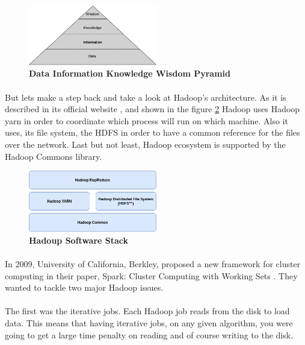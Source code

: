 \begin{figure}[h]
	\centering
	\includegraphics[width=0.5\textwidth]{images/DIKW.png}
	\caption{\bfseries Data Information Knowledge Wisdom Pyramid \cite{TheWisdomHierachy:7}}
	\label{dikw}
\end{figure}
\paragraph{} But lets make a step back and take a look at Hadoop's architecture. As it is described in its official website \cite{Hadoop:9}, and shown in the figure \ref{hadoopStack} Hadoop uses Hadoop yarn in order to coordinate which process will run on which machine. Also it uses, its file system, the HDFS in order to have a common reference for the files over the network. Last but not least, Hadoop ecosystem is supported by the Hadoop Commons library. 

\begin{figure}[h]
	\centering
	\includegraphics[width=0.5\textwidth]{images/hadoop-stack.png}
	\caption{\bfseries Hadoup Software Stack}
	\label{hadoopStack}
\end{figure}

\paragraph{} In 2009, University of California, Berkley, proposed a new framework for cluster computing in their paper, Spark: Cluster Computing with Working Sets \cite{Zaharia:2010:SCC:1863103.1863113}. They wanted to tackle two major Hadoop issues. 

\paragraph{}The first was the iterative jobs. Each Hadoop job reads from the disk to load data. This means that having iterative jobs, on any given algorithm, you were going to get a large time penalty on reading and of course writing to the disk. 

